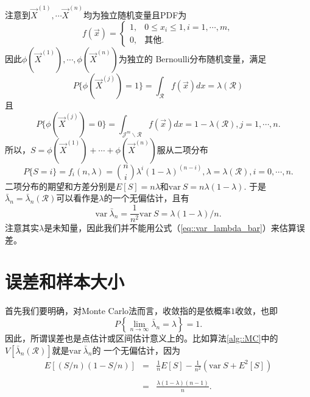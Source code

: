 注意到$\vec{X}^{(1)}, \cdots \vec{X}^{(n)}$均为独立随机变量且PDF为
\begin{equation}
  f(\vec{x}) = \left\{
  \begin{array}{ll}
    1, & 0 \leq x_i \leq 1, i = 1, \cdots, m,\\
    0, & \mbox{其他}.
  \end{array}
  \right.
  \label{eq::MC_X_PDF}
\end{equation}
因此$\phi(\vec{X}^{(1)}), \cdots, \phi(\vec{X}^{(n)})$为独立的
Bernoulli分布随机变量，满足
\begin{equation}
  P\{\phi(\vec{X}^{(j)}) = 1\} = \int_{\mathscr{R}} f(\vec{x}) dx =
  \lambda(\mathscr{R})
  \label{eq::MC_phi_X}
\end{equation}
且
\begin{equation}
  P\{\phi(\vec{X}^{(j)}) = 0\} = \int_{\mathscr{J}^m \backslash
    \mathscr{R}} f(\vec{x}) dx = 1 - \lambda(\mathscr{R}), j = 1, \cdots, n.
  \label{eq::MC_phi_X_R}
\end{equation}
所以，$S = \phi(\vec{X}^{(1)}) + \cdots + \phi(\vec{X}^{(n)})$服从二项分布
\begin{equation}
  P\{S = i\} = f_i(n, \lambda) = \binom{n}{i} \lambda^i (1 -
  \lambda)^{(n - i)}, \lambda = \lambda(\mathscr{R}), i = 0, \cdots, n.
  \label{eq::MC_Bernoulli}
\end{equation}
二项分布的期望和方差分别是$E[S] = n \lambda$和$\mathrm{var~} S =
n\lambda(1 - \lambda)$. 于是$\bar{\lambda}_n =
\bar{\lambda}_n(\mathscr{R})$可以看作是$\lambda$的一个无偏估计，且有
\begin{equation}
  \mathrm{var~} \bar{\lambda}_n = \frac{1}{n^2} \mathrm{var~} S =
  \lambda (1 - \lambda) / n.
  \label{eq::var_lambda_bar}
\end{equation}
注意其实$\lambda$是未知量，因此我们并不能用公式（\ref{eq::var_lambda_bar}）来估算误差。

\section{误差和样本大小}

首先我们要明确，对Monte Carlo法而言，收敛指的是依概率$1$收敛，也即
\begin{equation}
  P\left\{\lim_{n \to \infty} \bar{\lambda}_n = \lambda \right\} = 1.
\end{equation}
因此，所谓误差也是点估计或区间估计意义上的。比如算法\ref{alg::MC}中的
$V[\bar{\lambda}_n(\mathscr{R})]$就是$\mathrm{var~} \bar{\lambda}_n$的
一个无偏估计，因为
\begin{equation}
  \begin{array}{rcl}
  E[(S / n) (1 - S / n)] &=&  \displaystyle \frac{1}{n} E[S] -
  \frac{1}{n^2}(\mathrm{var~} S + E^2[S])\\\\
  &=& \displaystyle\frac{\lambda (1 - \lambda) (n - 1)}{n}.
 \end{array}
\end{equation}

